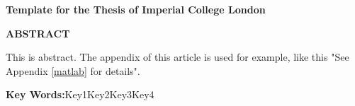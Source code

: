 \vspace*{-21.6pt}
\begin{center}
\Large
\textbf{Template for the Thesis of Imperial College London}
\end{center}
\par
{}
{}
\begin{center}
    \fontsize{14pt}{17pt}\selectfont\rmfamily\bfseries
ABSTRACT
\end{center}

\par
This is abstract. The appendix of this article is used for example, like this "See Appendix \ref{matlab} for details".

\bigskip
\noindent\textbf{Key Words:}\quad Key1\quad Key2\quad Key3\quad Key4
